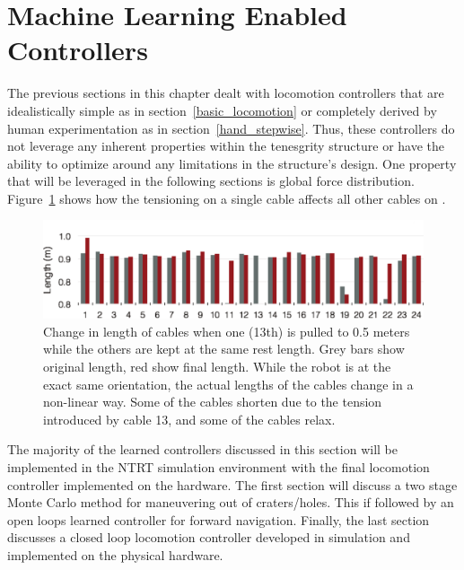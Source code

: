 \section{Machine Learning Enabled Controllers}
\label{sec:machine_learning}
The previous sections in this chapter dealt with locomotion controllers that are idealistically simple as in section~\ref{basic_locomotion} or completely derived by human experimentation as in section~\ref{hand_stepwise}.
Thus, these controllers do not leverage any inherent properties within the tenesgrity structure or have the ability to optimize around any limitations in the structure's design.
One property that will be leveraged in the following sections is global force distribution.
Figure~\ref{fig:nonlinear} shows how the tensioning on a single cable affects all other cables on \SB{}.

\begin{figure}[thpb]
\centering
\includegraphics[width=\columnwidth]{tex/ASME-journal/results/actuate1/actuate1.eps}
\caption{Change in length of cables when one (13th) is pulled to 0.5 meters while the others are kept at the same rest length.  Grey bars show original length, red show final length. While the robot is at the exact same orientation, the actual lengths of the cables change in a non-linear way.  Some of the cables shorten due to the tension introduced by cable 13, and some of the cables relax.}
\label{fig:nonlinear}
\end{figure}

The majority of the learned controllers discussed in this section will be implemented in the NTRT simulation environment with the final locomotion controller implemented on the \SB{} hardware.
The first section will discuss a two stage Monte Carlo method for maneuvering \SB{} out of craters/holes.
This if followed by an open loops learned controller for forward navigation.
Finally, the last section discusses a closed loop locomotion controller developed in simulation and implemented on the physical \SB{} hardware.


